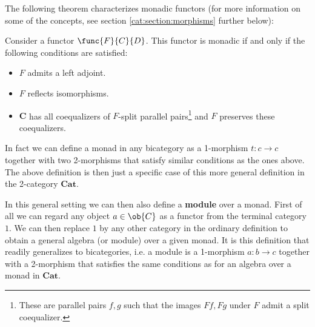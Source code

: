     The following theorem characterizes monadic functors (for more information on some of the concepts, see section \ref{cat:section:morphisms} further below):
    \begin{theorem}
        Consider a functor $\func{F}{C}{D}$. This functor is monadic if and only if the following conditions are satisfied:
        \begin{itemize}
            \item $F$ admits a left adjoint.
            \item $F$ reflects isomorphisms.
            \item $\mathbf{C}$ has all coequalizers of $F$-split parallel pairs\footnote{These are parallel pairs $f,g$ such that the images $Ff,Fg$ under $F$ admit a split coequalizer.} and $F$ preserves these coequalizers.
        \end{itemize}
    \end{theorem}


    \begin{remark}
        In fact we can define a monad in any bicategory as a 1-morphism $t:c\rightarrow c$ together with two 2-morphisms that satisfy similar conditions as the ones above. The above definition is then just a specific case of this more general definition in the 2-category $\mathbf{Cat}$.

        In this general setting we can then also define a \textbf{module} over a monad. First of all we can regard any object $a\in\ob{C}$ as a functor from the terminal category $1$. We can then replace $1$ by any other category in the ordinary definition to obtain a general algebra (or module) over a given monad. It is this definition that readily generalizes to bicategories, i.e. a module is a 1-morphism $a:b\rightarrow c$ together with a 2-morphism that satisfies the same conditions as for an algebra over a monad in $\mathbf{Cat}$.
    \end{remark}


